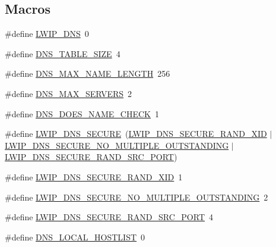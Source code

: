 \subsection*{Macros}
\begin{DoxyCompactItemize}
\item 
\#define \hyperlink{group__lwip__opts__dns_ga98710dd81446b7cb2daac736bae6f646}{L\+W\+I\+P\+\_\+\+D\+NS}~0
\item 
\#define \hyperlink{group__lwip__opts__dns_ga2384e76c1acdf969d883f3de08d340f7}{D\+N\+S\+\_\+\+T\+A\+B\+L\+E\+\_\+\+S\+I\+ZE}~4
\item 
\#define \hyperlink{group__lwip__opts__dns_ga3b01c79902063c170ef57deb72f56124}{D\+N\+S\+\_\+\+M\+A\+X\+\_\+\+N\+A\+M\+E\+\_\+\+L\+E\+N\+G\+TH}~256
\item 
\#define \hyperlink{group__lwip__opts__dns_ga9f9881c887a8aceb9765820c2dbdf292}{D\+N\+S\+\_\+\+M\+A\+X\+\_\+\+S\+E\+R\+V\+E\+RS}~2
\item 
\#define \hyperlink{group__lwip__opts__dns_ga07ffd8e9106dae3b65347bd03811a4b6}{D\+N\+S\+\_\+\+D\+O\+E\+S\+\_\+\+N\+A\+M\+E\+\_\+\+C\+H\+E\+CK}~1
\item 
\#define \hyperlink{group__lwip__opts__dns_ga8979c30dfbfde609d5139f80aabdfcc5}{L\+W\+I\+P\+\_\+\+D\+N\+S\+\_\+\+S\+E\+C\+U\+RE}~(\hyperlink{group__lwip__opts__dns_ga247795be83258f9afd0e3649a20fe30d}{L\+W\+I\+P\+\_\+\+D\+N\+S\+\_\+\+S\+E\+C\+U\+R\+E\+\_\+\+R\+A\+N\+D\+\_\+\+X\+ID} $\vert$ \hyperlink{group__lwip__opts__dns_ga5cabf5668bb2532408d9dcb8caf56092}{L\+W\+I\+P\+\_\+\+D\+N\+S\+\_\+\+S\+E\+C\+U\+R\+E\+\_\+\+N\+O\+\_\+\+M\+U\+L\+T\+I\+P\+L\+E\+\_\+\+O\+U\+T\+S\+T\+A\+N\+D\+I\+NG} $\vert$ \hyperlink{group__lwip__opts__dns_ga3aa0b17e6093d9e109790b28d6adfa65}{L\+W\+I\+P\+\_\+\+D\+N\+S\+\_\+\+S\+E\+C\+U\+R\+E\+\_\+\+R\+A\+N\+D\+\_\+\+S\+R\+C\+\_\+\+P\+O\+RT})
\item 
\#define \hyperlink{group__lwip__opts__dns_ga247795be83258f9afd0e3649a20fe30d}{L\+W\+I\+P\+\_\+\+D\+N\+S\+\_\+\+S\+E\+C\+U\+R\+E\+\_\+\+R\+A\+N\+D\+\_\+\+X\+ID}~1
\item 
\#define \hyperlink{group__lwip__opts__dns_ga5cabf5668bb2532408d9dcb8caf56092}{L\+W\+I\+P\+\_\+\+D\+N\+S\+\_\+\+S\+E\+C\+U\+R\+E\+\_\+\+N\+O\+\_\+\+M\+U\+L\+T\+I\+P\+L\+E\+\_\+\+O\+U\+T\+S\+T\+A\+N\+D\+I\+NG}~2
\item 
\#define \hyperlink{group__lwip__opts__dns_ga3aa0b17e6093d9e109790b28d6adfa65}{L\+W\+I\+P\+\_\+\+D\+N\+S\+\_\+\+S\+E\+C\+U\+R\+E\+\_\+\+R\+A\+N\+D\+\_\+\+S\+R\+C\+\_\+\+P\+O\+RT}~4
\item 
\#define \hyperlink{group__lwip__opts__dns_gacba1ac491c1b47b98dfbd0d5c1662659}{D\+N\+S\+\_\+\+L\+O\+C\+A\+L\+\_\+\+H\+O\+S\+T\+L\+I\+ST}~0

\end{DoxyCompactItemize}
